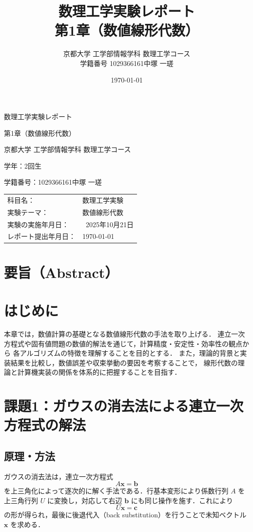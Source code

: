 \documentclass[a4paper,11pt]{ltjsarticle}
\title{数理工学実験レポート\\\vspace{5pt}\large 第1章（数値線形代数）}
\author{京都大学 工学部情報学科 数理工学コース\\学籍番号 1029366161\quad 中塚 一瑳}
\date{\today}
\begin{document}
\begin{titlepage}
\centering
{\Large 数理工学実験レポート\par}
\vspace{4mm}
{\large 第1章（数値線形代数）\par}
\vspace{15mm}
{\large 京都大学 工学部情報学科 数理工学コース\par}
{\large 学年：2回生\par}
{\large 学籍番号：1029366161\quad 中塚 一瑳\par}
\vspace{10mm}
\begin{tabular}{@{}ll}
科目名： & 数理工学実験 \\
実験テーマ： & 数値線形代数 \\
実験の実施年月日： & ~2025年10月21日 \\
レポート提出年月日： & \today \\
\end{tabular}
\vfill
\end{titlepage}

\section*{要旨（Abstract）}


\section{はじめに}
本章では，数値計算の基礎となる数値線形代数の手法を取り上げる．
連立一次方程式や固有値問題の数値的解法を通じて，計算精度・安定性・効率性の観点から
各アルゴリズムの特徴を理解することを目的とする．
また，理論的背景と実装結果を比較し，数値誤差や収束挙動の要因を考察することで，
線形代数の理論と計算機実装の関係を体系的に把握することを目指す．


\section{課題1：ガウスの消去法による連立一次方程式の解法}

\subsection{原理・方法}
ガウスの消去法は，連立一次方程式
\[
A\boldsymbol{x} = \boldsymbol{b}
\]
を上三角化によって逐次的に解く手法である．行基本変形により係数行列 $A$ を上三角行列 $U$ に変換し，対応して右辺 $\boldsymbol{b}$ にも同じ操作を施す．これにより
\[
U\boldsymbol{x} = \boldsymbol{c}
\]
の形が得られ，最後に後退代入（back substitution）を行うことで未知ベクトル $\boldsymbol{x}$ を求める．
\end{document}
